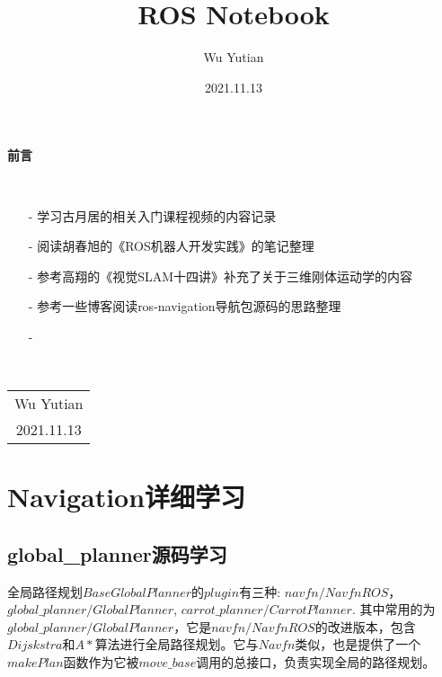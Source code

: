 \documentclass[9pt, oneside]{book}
\title{\Huge{\textbf{ROS Notebook}}}
\author{Wu Yutian}
\date{2021.11.13}
\begin{document}
\maketitle

\setcounter{page}{1}

\begin{center}
    \Huge\textbf{前言}
\end{center}~\

\normalsize
\begin{itemize}
    \item [-] 学习古月居的相关入门课程视频的内容记录
    \item [-] 阅读胡春旭的《ROS机器人开发实践》的笔记整理
    \item [-] 参考高翔的《视觉SLAM十四讲》补充了关于三维刚体运动学的内容
    \item [-] 参考一些博客阅读ros-navigation导航包源码的思路整理
    \item [-]
\end{itemize}

~\\
\begin{flushright}     
    \begin{tabular}{c}
        Wu Yutian\\
        2021.11.13
    \end{tabular}
\end{flushright}

\newpage
{}
\setcounter{page}{1}
\tableofcontents
\newpage
\setcounter{page}{1}





\chapter{Navigation详细学习}

\section{global\_planner源码学习}

全局路径规划$BaseGlobalPlanner$的$plugin$有三种: $navfn/NavfnROS$，$global\_planner/GlobalPlanner$, $carrot\_planner/CarrotPlanner$. 其中常用的为$global\_planner/GlobalPlanner$，它是$navfn/NavfnROS$的改进版本，包含$Dijskstra$和$A*$算法进行全局路径规划。它与$Navfn$类似，也是提供了一个$makePlan$函数作为它被$move\_base$调用的总接口，负责实现全局的路径规划。
\end{document}
